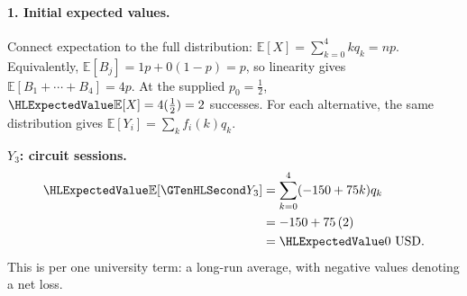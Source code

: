 \paragraph{1. Initial expected values.}
Connect expectation to the full distribution: $\mathbb E[X]=\sum_{k=0}^4kq_k=np$.
Equivalently, $\mathbb E[B_j]=1p+0(1-p)=p$, so linearity gives
$\mathbb E[B_1+\cdots+B_4]=4p$.
At the supplied $p_0=\frac{1}{2}$, $\ExpectedValue{\mathbb E[X]}=4(\frac{1}{2})=2$ successes.
For each alternative, the same distribution gives $\mathbb E[Y_i]=\sum_k f_i(k)q_k$.
\par\noindent\begin{minipage}[t]{.48\linewidth}\vspace{0pt}
\textbf{$Y_3$: circuit sessions.}
\[
\begin{aligned}
\ExpectedValue{\mathbb E}[\Money{Y_3}]&=\sum_{k=0}^4(-150+75k)q_k\\
&=-150+75\left(2\right)\\
&=\ExpectedValue{0\ \text{USD}}.
\end{aligned}
\]
This is  per one university term: a long-run average, with negative values denoting a net loss.
\end{minipage}\par
